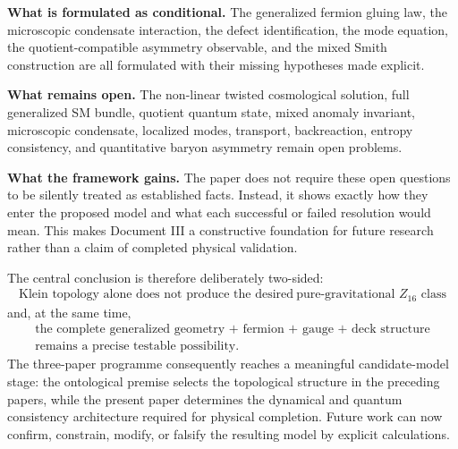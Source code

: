 \documentclass[11pt]{article}
\theoremstyle{canonmath}
\theoremstyle{canonpostulate}
\theoremstyle{canonclaim}
\def\mathbb#1{#1}%
\begin{document}
\textbf{What is formulated as conditional.} The generalized fermion gluing law, the microscopic condensate interaction, the defect identification, the mode equation, the quotient-compatible asymmetry observable, and the mixed Smith construction are all formulated with their missing hypotheses made explicit.

\textbf{What remains open.} The non-linear twisted cosmological solution, full generalized SM bundle, quotient quantum state, mixed anomaly invariant, microscopic condensate, localized modes, transport, backreaction, entropy consistency, and quantitative baryon asymmetry remain open problems.

\textbf{What the framework gains.} The paper does not require these open questions to be silently treated as established facts. Instead, it shows exactly how they enter the proposed model and what each successful or failed resolution would mean. This makes Document III a constructive foundation for future research rather than a claim of completed physical validation.

The central conclusion is therefore deliberately two-sided:
\begin{equation*}
\boxed{\begin{gathered}
\text{Klein topology alone does not produce the desired}\
\text{pure-gravitational }\mathbb Z_{16}\text{ class}
\end{gathered}}
\end{equation*}
and, at the same time,
\begin{equation*}
\boxed{\begin{gathered}
\text{the complete generalized geometry + fermion + gauge + deck structure}\\
\text{remains a precise testable possibility.}
\end{gathered}}
\end{equation*}
The three-paper programme consequently reaches a meaningful candidate-model stage: the ontological premise selects the topological structure in the preceding papers, while the present paper determines the dynamical and quantum consistency architecture required for physical completion. Future work can now confirm, constrain, modify, or falsify the resulting model by explicit calculations.
\end{document}
